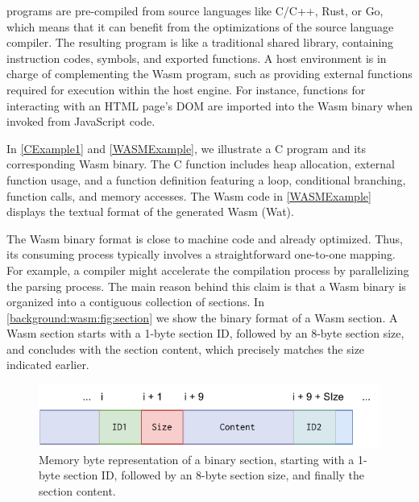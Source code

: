 

\Wasm programs are pre-compiled from source languages like C/C++, Rust, or Go, which means that it can benefit from the optimizations of the source language compiler.
The resulting \wasm program is like a traditional shared library, containing instruction codes, symbols, and exported functions. 
A host environment is in charge of complementing the Wasm program, such as providing external functions required for execution within the host engine. 
For instance, functions for interacting with an HTML page's DOM are imported into the Wasm binary when invoked from JavaScript code. 


In \autoref{CExample1} and \autoref{WASMExample}, we illustrate a C program and its corresponding Wasm binary. 
The C function includes heap allocation, external function usage, and a function definition featuring a loop, conditional branching, function calls, and memory accesses. 
The Wasm code in \autoref{WASMExample} displays the textual format of the generated Wasm (Wat).




\label{background:wasm:binary}

The Wasm binary format is close to machine code and already optimized.
Thus, its consuming process typically involves a straightforward one-to-one mapping.
For example, a compiler might accelerate the compilation process by parallelizing the parsing process. 
The main reason behind this claim is that a Wasm binary is organized into a contiguous collection of sections.
In \autoref{background:wasm:fig:section} we show the binary format of a Wasm section.
A Wasm section starts with a 1-byte section ID, followed by an 8-byte section size, and concludes with the section content, which precisely matches the size indicated earlier.


    
\begin{figure}[h]
    \centering
    \includegraphics[width=0.5\linewidth]{figures/section.pdf}
    \caption{Memory byte representation of a \Wasm binary section, starting with a 1-byte section ID, followed by an 8-byte section size, and finally the section content.}
    \label{background:wasm:fig:section}
\end{figure}

